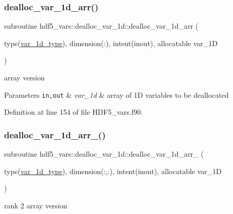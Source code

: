 \subsubsection{\texorpdfstring{dealloc\+\_\+var\+\_\+1d\+\_\+arr()}{dealloc\_var\_1d\_arr()}}
{\footnotesize\ttfamily subroutine hdf5\+\_\+vars\+::dealloc\+\_\+var\+\_\+1d\+::dealloc\+\_\+var\+\_\+1d\+\_\+arr (\begin{DoxyParamCaption}\item[{type(\hyperlink{structhdf5__vars_1_1var__1d__type}{var\+\_\+1d\+\_\+type}), dimension(\+:), intent(inout), allocatable}]{var\+\_\+1D }\end{DoxyParamCaption})}



array version 


\begin{DoxyParams}[1]{Parameters}
\mbox{\tt in,out}  & {\em var\+\_\+1d} & array of 1D variables to be deallocated \\
\hline
\end{DoxyParams}


Definition at line 154 of file H\+D\+F5\+\_\+vars.\+f90.

\mbox{\label{interfacehdf5__vars_1_1dealloc__var__1d_ae0984cd8e6d60ef3297c3662d0789dbb}} 
\subsubsection{\texorpdfstring{dealloc\+\_\+var\+\_\+1d\+\_\+arr\+\_()}{dealloc\_var\_1d\_arr\_2()}}
{\footnotesize\ttfamily subroutine hdf5\+\_\+vars\+::dealloc\+\_\+var\+\_\+1d\+::dealloc\+\_\+var\+\_\+1d\+\_\+arr\+\_ (\begin{DoxyParamCaption}\item[{type(\hyperlink{structhdf5__vars_1_1var__1d__type}{var\+\_\+1d\+\_\+type}), dimension(\+:,\+:), intent(inout), allocatable}]{var\+\_\+1D }\end{DoxyParamCaption})}



rank 2 array version 


